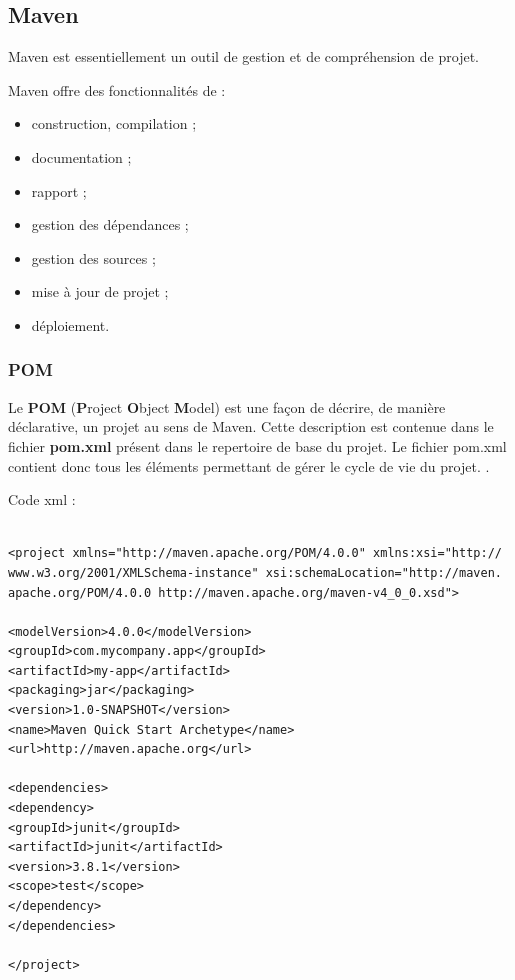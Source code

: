 \subsection{Maven} 
 


Maven est essentiellement un outil de gestion et de compréhension de projet. 

Maven offre des fonctionnalités de :
\begin{itemize}
\item construction,  compilation ;
\item documentation ;
\item  rapport ;
\item  gestion des dépendances ;
\item  gestion des sources ;
\item mise à jour de projet ;
\item  déploiement.
\end{itemize}

\subsubsection{ POM  }
Le \textbf{POM} (\textbf{P}roject \textbf{O}bject \textbf{M}odel) est une façon de décrire, de manière déclarative, un projet au sens de Maven. Cette description est contenue dans le fichier \textbf{pom.xml} présent dans le repertoire de base du projet. Le fichier pom.xml contient donc tous les éléments permettant de gérer le cycle de vie du projet. \cite{maven}.

Code xml :	
 \lstset{language=XML}
\begin{lstlisting}

<project xmlns="http://maven.apache.org/POM/4.0.0" xmlns:xsi="http://
www.w3.org/2001/XMLSchema-instance" xsi:schemaLocation="http://maven.
apache.org/POM/4.0.0 http://maven.apache.org/maven-v4_0_0.xsd"> 

<modelVersion>4.0.0</modelVersion> 
<groupId>com.mycompany.app</groupId> 
<artifactId>my-app</artifactId> 
<packaging>jar</packaging> 
<version>1.0-SNAPSHOT</version> 
<name>Maven Quick Start Archetype</name> 
<url>http://maven.apache.org</url> 

<dependencies> 
<dependency> 
<groupId>junit</groupId> 
<artifactId>junit</artifactId> 
<version>3.8.1</version> 
<scope>test</scope> 
</dependency> 
</dependencies> 

</project>

\end{lstlisting}


